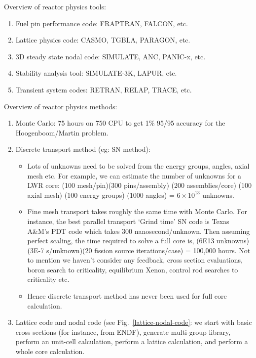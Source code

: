 \documentclass{school-22.211-notes}
\begin{document}
\clearpage
{}
Overview of reactor physics tools: 
\begin{enumerate}
\item Fuel pin performance code: FRAPTRAN, FALCON, etc. 
\item Lattice physics code: CASMO, TGBLA, PARAGON, etc. 
\item 3D steady state nodal code: SIMULATE, ANC, PANIC-x, etc.
\item Stability analysis tool: SIMULATE-3K, LAPUR, etc.
\item Transient system codes: RETRAN, RELAP, TRACE, etc.
\end{enumerate}
Overview of reactor physics methods:
\begin{enumerate}
\item Monte Carlo: 75 hours on 750 CPU to get 1\% 95/95 accuracy for the Hoogenboom/Martin problem. 

\item Discrete transport method (eg: SN method): 
  \begin{itemize}
    \item Lots of unknowns need to be solved from the energy groups, angles, axial mesh etc. For example, we can estimate the number of unknowns for a LWR core: (100 mesh/pin)(300 pins/assembly) (200 assemblies/core) (100 axial mesh) (100 energy groups) (1000 angles) = $6 \times 10^{13}$ unknowns. 
    \item Fine mesh transport takes roughly the same time with Monte Carlo. For instance, the best parallel transport `Grind time' SN code is Texas A\&M's PDT code which takes 300 nanosecond/unknown. Then assuming perfect scaling, the time required to solve a full core is, (6E13 unknowns)(3E-7 s/unknown)(20 fission source iterations/case) = 100,000 hours. Not to mention we haven't consider any feedback, cross section evaluations, boron search to criticality, equilibrium Xenon, control rod searches to criticality etc. 
    \item Hence discrete transport method has never been used for full core calculation. 
  \end{itemize}

\item Lattice code and nodal code (see Fig.~\ref{lattice-nodal-code}: we start with basic cross sections (for instance, from ENDF), generate multi-group library, perform an unit-cell calculation, perform a lattice calculation, and perform a whole core calculation. 
\end{enumerate}
\end{document}
